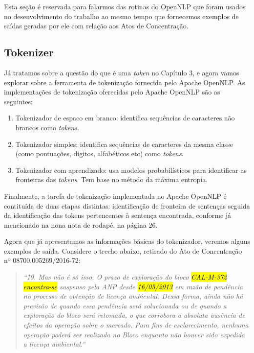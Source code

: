 \documentclass[11pt]{report}
\newcommand{\quotes}[1]{``#1''}
\begin{document}
Esta seção é reservada para falarmos das rotinas do OpenNLP que foram usados no desenvolvimento do trabalho
ao mesmo tempo que fornecemos exemplos de saídas geradas por ele com relação aos Atos de Concentração.


\subsection{Tokenizer}

\indent\indent Já tratamos sobre a questão do que é uma \textit{token} no Capítulo 3, e agora vamos explorar sobre a ferramenta de
tokenização fornecida pelo Apache OpenNLP. As implementações de tokenização oferecidas pelo Apache OpenNLP são as seguintes:

\begin{enumerate}[label=\textbf{{\Roman*.}}]
  \item Tokenizador de espaco em branco: identifica sequências de caracteres não brancos como \textit{tokens}.
  \item Tokenizador simples: identifica sequências de caracteres da mesma classe (como pontuações, digitos, alfabéticos etc) como \textit{tokens}.
  \item Tokenizador com aprendizado: usa modelos probabilísticos para identificar as fronteiras das \textit{tokens}. Tem base no método da máxima entropia.
\end{enumerate}

Finalmente, a tarefa de tokenização implementada no Apache OpenNLP é contituída de duas etapas distintas: identificação de fronteira de sentenças seguida da identificação das
tokens pertencentes à sentença encontrada, conforme já mencionado na nona nota de rodapé, na página 26.

Agora que já apresentamos as informações básicas do tokenizador, veremos alguns exemplos de saída. Considere o trecho abaixo, retirado do Ato de Concentração nº 08700.005269/2016-72:

\begin{quote}
  \textit{\quotes{19. Mas não é só isso. O prazo de exploração do bloco \hl{CAL-M-372} \hl{encontra-se} suspenso pela ANP desde \hl{16/05/2013} em razão de pendência no processo de obtenção de licença ambiental. Dessa forma, ainda não há previsão de quando essa pendência será solucionada ou de quando a exploração do bloco será retomada, o que corrobora a absoluta ausência de efeitos da operação sobre o mercado. Para fins de esclarecimento, nenhuma operação poderá ser realizada no Bloco enquanto não houver sido expedida a licença ambiental.}}
\end{quote}
\end{document}
